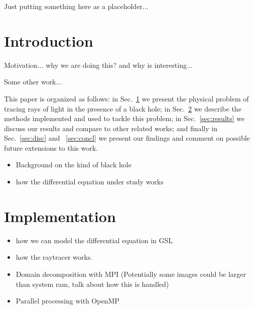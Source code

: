 Just putting something here as a placeholder...



\section{Introduction}
\label{sec:intro}



Motivation... why we are doing this? and why is interesting...

Some other work... \cite{sharma2023mahakalapythonbasedmodularraytracing,James_2015,imbens2023graphicalprocessinggeodesicpropagation}

This paper is organized as follows:
in Sec.~\ref{sec:intro} we present the physical problem of tracing rays of light in the presence of a black hole;
in Sec.~\ref{sec:impl} we describe the methods implemented and used to tackle this problem;
in Sec.~\ref{sec:results} we discuss our results and compare to other related works;
and finally in Sec.~\ref{sec:disc} and ~\ref{sec:concl} we present our findings and comment
on possible future extensions to this work.


\begin{itemize}
	\item Background on the kind of black hole
	\item how the differential equation under study works
\end{itemize}



\section{Implementation}
\label{sec:impl}

\begin{itemize}
	\item how we can model the differential equation in GSL
    	\item how the raytracer works.
    	\item Domain decomposition with MPI (Potentially some images could be larger than system ram, talk about how this is handled)
    	\item Parallel processing with OpenMP
\end{itemize}



